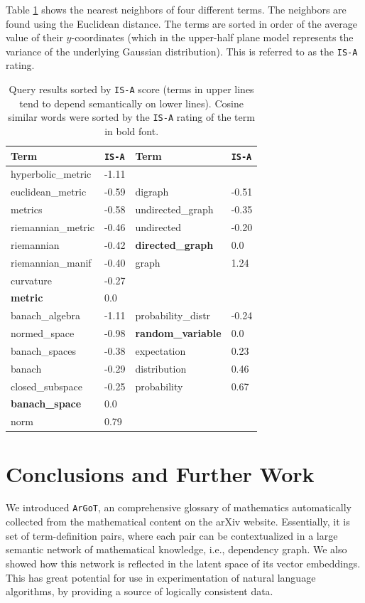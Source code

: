 \documentclass[submission,copyright,creativecommons]{eptcs}
\newcommand{\argot}{\texttt{ArGoT}\xspace}
\newcommand{\isa}{\texttt{IS-A}\xspace}
\begin{document}
Table \ref{tab:hypernyny} shows the nearest neighbors of four
different terms.  The neighbors are found using the Euclidean distance. 
The terms are 
sorted in order of the average value of their $y$-coordinates (which in
the upper-half plane model represents the variance of the underlying
Gaussian distribution). This is referred to as the \isa rating. 


\begin{table}
    \small
\centering
\begin{tabular}{ll|ll}
    \hline \textbf{Term} &  \isa &  
    \textbf{Term} &  \isa \\ \hline
    hyperbolic\_metric & -1.11 &  &\\
euclidean\_metric & -0.59  & digraph & -0.51 \\
metrics & -0.58 & undirected\_graph & -0.35 \\
riemannian\_metric & -0.46  &  undirected & -0.20 \\
riemannian & -0.42  & \textbf{directed\_graph} &  0.0\\
riemannian\_manif & -0.40 & graph & 1.24 \\
curvature & -0.27  & & \\
\textbf{metric} & 0.0 & & \\
\hline
banach\_algebra & -1.11  & probability\_distr & -0.24 \\
normed\_space & -0.98 & \textbf{random\_variable} & 0.0 \\
banach\_spaces & -0.38 & expectation & 0.23 \\
banach & -0.29  & distribution & 0.46 \\
closed\_subspace & -0.25 & probability & 0.67 \\
\textbf{banach\_space} & 0.0 & & \\
norm & 0.79 & & \\

\end{tabular}
\caption{\label{tab:hypernyny} 
   Query results sorted by \isa score (terms in upper lines tend to depend semantically on lower lines).  Cosine similar words were sorted by the
    \isa rating of the term in bold font. }
\end{table}

\section{Conclusions and Further Work}
We introduced \argot, an comprehensive glossary of mathematics
automatically collected from the mathematical content on the arXiv website. 
Essentially, it is set of term-definition pairs, where 
each pair can be contextualized in a large semantic network of
mathematical knowledge, i.e., dependency graph. We also showed how this 
network is reflected in the latent space of its vector embeddings. This
has great potential for use in experimentation of natural language
algorithms, by providing a source of logically consistent data. 
\end{document}
